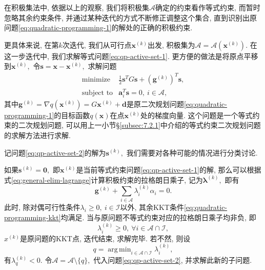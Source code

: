 \documentclass{SBCbookchapter}
\newcommand{\V}[1]{{\bm{#1}}}
\DeclareMathOperator*{\argmin}{arg\,min}
\numberwithin{equation}{section}
\begin{document}
在积极集法中, 依据以上的观察, 我们将积极集$\mathcal{A}$确定的约束看作等式约束, 而暂时忽略其余约束条件, 并通过某种迭代的方式不断修正调整这个集合, 直到识别出原问题\eqref{eq:quadratic-programming-1}的解处的正确的积极约束.

更具体来说, 在第$k$次迭代, 我们从可行点$\V{x}^{(k)}$出发, 积极集为$\mathcal{A} = \mathcal{A}(\V{x}^{(k)}).$ 在这一步迭代中, 我们求解等式问题\eqref{eq:qp-active-set-1}. 更方便的做法是将原点平移到$\V{x}^{(k)},$ 令$\V{s} = \V{x} - \V{x}^{(k)},$ 求解问题
\begin{equation}
\label{eq:qp-active-set-2}
\begin{array}{cl}
\text{minimize} & \frac{1}{2} \V{s}^T G \V{s} + \left( \V{g}^{(k)} \right)^T \V{s}, \\
\text{subject to} & \V{a}_i^T \V{s} = 0, ~ i \in \mathcal{A},
\end{array}
\end{equation}
其中$\V{g}^{(k)} = \nabla q(\V{x}^{(k)}) = G \V{x}^{(k)} + \V{d}$是原二次规划问题\eqref{eq:quadratic-programming-1}的目标函数$q(\V{x})$在点$\V{x}^{(k)}$处的梯度向量. 这个问题是一个等式约束的二次规划问题, 可以用上一小节\S\ref{subsec:7.2.1}中介绍的等式约束二次规划问题的求解方法进行求解.

记问题\eqref{eq:qp-active-set-2}的解为$\V{s}^{(k)},$ 我们需要对各种可能的情况进行分类讨论.

如果$\V{s}^{(k)} = \V{0},$ 即$\V{x}^{(k)}$是当前等式约束问题\eqref{eq:qp-active-set-1}的解, 那么可以根据式\eqref{eq:general-elim-lagrange}计算积极约束的拉格朗日乘子, 记为$\V{\lambda}^{(k)},$ 即有
\begin{equation}
\label{eq:qp-active-set-lambda}
\V{g}^{(k)} + \sum\limits_{i \in \mathcal{A}} \lambda_i^{(k)} \alpha_i = 0.
\end{equation}
此时, 除对偶可行性条件$\lambda_i \geqslant 0, ~ i \in \mathcal{I}$以外, 其余KKT条件\eqref{eq:quadratic-programming-kkt}均满足. 当与原问题不等式约束对应的拉格朗日乘子均非负, 即
\begin{equation*}
\lambda_i^{(k)} \geqslant 0, ~ \forall i \in \mathcal{A} \cap \mathcal{I},
\end{equation*}
$x^{(k)}$是原问题的KKT点, 迭代结束, 求解完毕. 若不然, 则设
\begin{equation*}
q = \argmin_{i \in \mathcal{A} \cap \mathcal{I}} \lambda_i^{(k)},
\end{equation*}
有$\lambda_q^{(k)} < 0.$ 令$\mathcal{A} = \mathcal{A} \setminus \{ q \},$ 代入问题\eqref{eq:qp-active-set-2}, 并求解此新的子问题.
\end{document}
